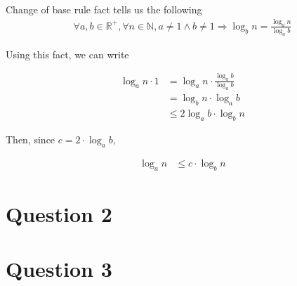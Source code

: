 \documentclass[12pt]{article}
\begin{document}
\begin{enumerate}[a.]
\begin{mdframed}
        \color{red}
        Change of base rule fact tells us the following
        \setcounter{equation}{0}
        \begin{align}
            \forall a,b \in \mathbb{R}^{+}, \forall n \in \mathbb{N},
            a \neq 1 \land b \neq 1 \Rightarrow \log_b n = \frac{\log_a n}{\log_a b}
        \end{align}

        Using this fact, we can write
        \color{black}

        \setcounter{equation}{0}
        \begin{align}
            \log_a n \cdot 1 &= \log_a n \cdot \frac{\log_a b}{\log_a b}\\
            &= \log_b n \cdot \log_a b\\
            &\leq 2 \log_a b \cdot \log_b n
        \end{align}

        \bigskip

        Then, since $c = 2 \cdot \log_a b$,

        \begin{align}
            \log_a n &\leq c \cdot \log_b n
        \end{align}

    \end{mdframed}

\end{enumerate}

\section*{Question 2}

\section*{Question 3}
\end{document}
